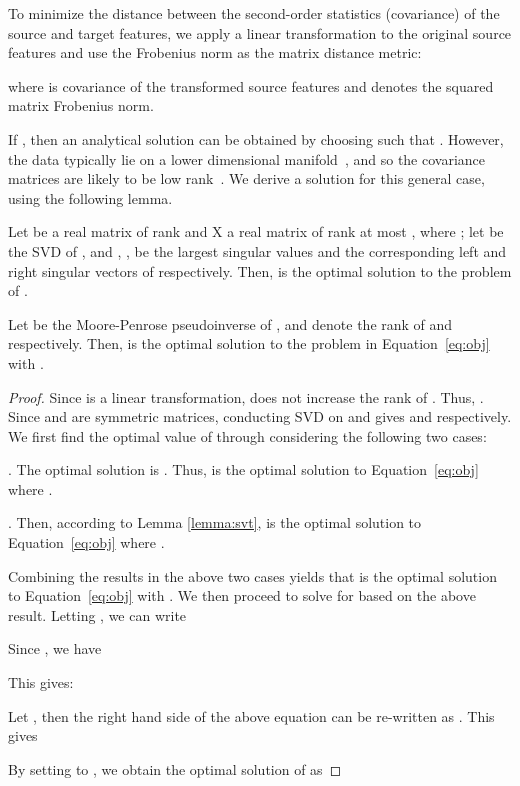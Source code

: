 \documentclass[graybox]{svmult}
\begin{document}
To minimize the distance between the second-order statistics (covariance) of the source and target features, we apply a linear transformation  to the original source features and use the Frobenius norm as the matrix distance metric:
      
where  is covariance of the transformed source features  and  denotes the squared matrix Frobenius norm. 

If , then an analytical solution can be obtained by choosing  such that .
However, the data typically lie on a lower dimensional manifold~\cite{outlooks,gfk,sa}, and so the covariance matrices are likely to be low rank~\cite{who}. We derive a solution for this general case, using the following lemma.
\begin{lemma} 
\label{lemma:svt}
Let  be a real matrix of rank  and X a real matrix of rank at most , where ; let  be the SVD of , and , ,  be the largest  singular values and the corresponding left and right singular vectors of  respectively. Then,  is the optimal solution to the problem of .~\cite{SVT}
\end{lemma}

\begin{theorem} 
Let  be the Moore-Penrose pseudoinverse of ,  and  denote the rank of  and  respectively.
Then,  is the optimal solution to the problem in Equation~\eqref{eq:obj} with .
\end{theorem}
\begin{proof}  Since  is a linear transformation,  does not increase the rank of . Thus, . Since  and  are symmetric matrices, conducting SVD on  and  gives  and  respectively. We first find the optimal value of  through considering the following two  cases:
\vspace{-0.05in}
\begin{case}
. The optimal solution is . Thus,  is the optimal solution to Equation~\eqref{eq:obj} where .
\end{case}
\vspace{-0.05in}
\begin{case}
. Then, according to Lemma \ref{lemma:svt},  is the optimal solution to Equation~\eqref{eq:obj} where .
\end{case}
Combining the results in the above two cases yields that  is the optimal solution to Equation~\eqref{eq:obj} with .
We then proceed to solve for  based on the above result. 
Letting , we can write

Since , we have

This gives:

Let , then the right hand side of the above equation can be re-written as . This gives

By setting  to , we obtain the optimal solution of  as 

\end{proof}
\end{document}
